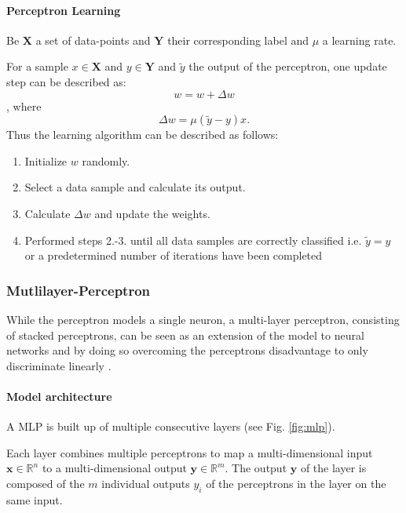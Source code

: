 \paragraph{Perceptron Learning} \label{c:perlearning}

Be $\textbf{X}$ a set of data-points and $\textbf{Y}$ their corresponding label and $\mu$ a learning rate. 

For a sample $x \in \textbf{X}$  and $y \in \textbf{Y}$ and $\tilde{y}$ the output of the perceptron, one update step can be described as:
\[ 
	w = w + \Delta w
\]
, where 
\[
	\Delta w = \mu (\tilde{y}-y) x .
\]
Thus the learning algorithm can be described as follows:

\begin{enumerate}
	\item Initialize $w$ randomly.
	\item Select a data sample and calculate its output.
	\item Calculate $\Delta w$ and update the weights.
	\item Performed steps 2.-3. until all data samples are correctly classified i.e. $\tilde{y} = y$ or a predetermined number of iterations have been completed
\end{enumerate}


\subsubsection{Mutlilayer-Perceptron} \label{c:mlp}

While the perceptron models a single neuron, a multi-layer perceptron, consisting of stacked perceptrons, can be seen as an extension of the model to neural networks and by doing so overcoming the perceptrons disadvantage to only discriminate linearly \cite{rumelhart1985learning}\cite{Goodfellow-et-al-2016-Book}. 

\paragraph{Model architecture} \label{c:mlparch}

A MLP is built up of multiple consecutive layers (see Fig. \ref{fig:mlp}).

Each layer combines multiple perceptrons to map a multi-dimensional input $\textbf{x} \in \mathbb{R}^n$ to a multi-dimensional output $\textbf{y} \in \mathbb{R}^m$.
The output $\textbf{y}$ of the layer is composed of the $m$ individual outputs $y_i$ of the perceptrons in the layer on the same input.


